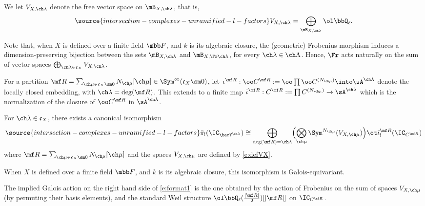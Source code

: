 We let $V_{X,\ch\lambda}$ denote the free vector space on $\mB_{X,\ch\lambda}$, that is,
\begin{equation}\label{e:defVX}
\source{intersection-complexes-unramified-l-factors}
V_{X,\ch\lambda} = \bigoplus_{\mB_{X,\ch\lambda}} \ol\bbQ_\ell.
\end{equation}


Note that, when $X$ is defined over a finite field $\mbb F$, and $k$ is its algebraic closure, the (geometric) Frobenius morphism induces a dimension-preserving bijection between the sets $\mB_{X,\ch\lambda}$ and $\mB_{X,\Fr\ch\lambda}$, for every $\ch\lambda\in\ch\Lambda$. Hence, $\Fr$ acts naturally on the sum of vector spaces $\bigoplus_{\ch\lambda\in\mathfrak c_X} V_{X,\ch\lambda}$.

For a partition $\mf R = \sum_{\ch\mu \in \mathfrak c_X \sm 0} N_{\ch\mu} [\ch\mu] \in \Sym^\infty(\mathfrak c_X\sm 0)$,
let $\iota^{\mf R} : \oo C^{\mf R} := \oo\prod \oo C^{(N_{\ch\mu})}
\into \sA^{\ch\lambda}$ denote the locally closed embedding, with $\ch\lambda = \deg(\mf R)$.
This extends to a finite map $\bar\iota^{\mf R} : C^{\mf R}:=\prod C^{(N_{\ch\mu})} \to \sA^{\ch\lambda}$ which is the normalization of the closure of $\oo C^{\mf R}$ in
$\sA^{\ch\lambda}$.

\begin{prop}
\notready \label{prop:format}
For $\ch\lambda \in \mathfrak c_X$, there
exists a canonical isomorphism
\begin{equation} \label{e:format1}
\source{intersection-complexes-unramified-l-factors}
 \bar\pi_!(\IC_{\barY^{\ch\lambda}}) \cong
\bigoplus_{\deg(\mf R)=\ch\lambda}
\Bigl( \bigotimes_{\ch\mu}
\Sym^{N_{\ch\mu}}(V_{X,\ch\mu}) \Bigr) \ot
\bar\iota^{\mf R}_!( \IC_{C^{\mf R}} )
\end{equation}
where $\mf R = \sum_{\ch\mu \in \mathfrak c_X\sm 0}
N_{\ch\mu} [\ch\mu]$ and the spaces $V_{X,\ch\mu}$ are defined by \eqref{e:defVX}.

When $X$ is defined over a finite field $\mbb F$, and $k$ is its algebraic closure, this isomorphism is Galois-equivariant.
\end{prop}

The implied Galois action on the right hand side  of \eqref{e:format1} is the one obtained by the action of Frobenius on the sum of spaces $V_{X,\ch\mu}$ (by permuting their basis elements), and the standard Weil structure $\ol\bbQ_\ell(\frac{|\mf R|}{2})[|\mf R|]$ on $\IC_{C^{\mf R}}$.

